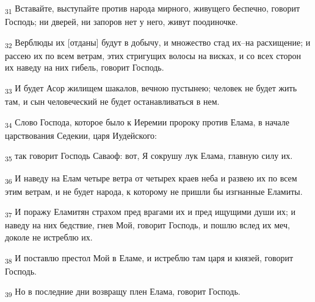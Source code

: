 \begin{tcolorbox}
\textsubscript{31} Вставайте, выступайте против народа мирного, живущего беспечно, говорит Господь; ни дверей, ни запоров нет у него, живут поодиночке.
\end{tcolorbox}
\begin{tcolorbox}
\textsubscript{32} Верблюды их [отданы] будут в добычу, и множество стад их--на расхищение; и рассею их по всем ветрам, этих стригущих волосы на висках, и со всех сторон их наведу на них гибель, говорит Господь.
\end{tcolorbox}
\begin{tcolorbox}
\textsubscript{33} И будет Асор жилищем шакалов, вечною пустынею; человек не будет жить там, и сын человеческий не будет останавливаться в нем.
\end{tcolorbox}
\begin{tcolorbox}
\textsubscript{34} Слово Господа, которое было к Иеремии пророку против Елама, в начале царствования Седекии, царя Иудейского:
\end{tcolorbox}
\begin{tcolorbox}
\textsubscript{35} так говорит Господь Саваоф: вот, Я сокрушу лук Елама, главную силу их.
\end{tcolorbox}
\begin{tcolorbox}
\textsubscript{36} И наведу на Елам четыре ветра от четырех краев неба и развею их по всем этим ветрам, и не будет народа, к которому не пришли бы изгнанные Еламиты.
\end{tcolorbox}
\begin{tcolorbox}
\textsubscript{37} И поражу Еламитян страхом пред врагами их и пред ищущими души их; и наведу на них бедствие, гнев Мой, говорит Господь, и пошлю вслед их меч, доколе не истреблю их.
\end{tcolorbox}
\begin{tcolorbox}
\textsubscript{38} И поставлю престол Мой в Еламе, и истреблю там царя и князей, говорит Господь.
\end{tcolorbox}
\begin{tcolorbox}
\textsubscript{39} Но в последние дни возвращу плен Елама, говорит Господь.
\end{tcolorbox}
